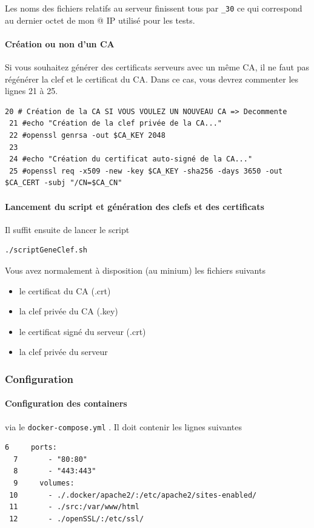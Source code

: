 \documentclass[french, 12pt]{article}%
\newcommand{\itemE}{\item[$\bullet$]}
\begin{document}
Les noms des fichiers relatifs au serveur finissent tous par \verb?_30? ce qui correspond au dernier octet de mon @ IP utilisé pour les tests.


\paragraph{Création ou non d'un CA}
Si vous souhaitez générer des certificats serveurs avec un même CA, il ne faut pas régénérer la clef et le certificat du CA. Dans ce cas, vous devrez commenter les lignes 21 à 25.

\begin{lstlisting}[style=commande]
 20 # Création de la CA SI VOUS VOULEZ UN NOUVEAU CA => Decommente
 21 #echo "Création de la clef privée de la CA..."
 22 #openssl genrsa -out $CA_KEY 2048
 23 
 24 #echo "Création du certificat auto-signé de la CA..."
 25 #openssl req -x509 -new -key $CA_KEY -sha256 -days 3650 -out $CA_CERT -subj "/CN=$CA_CN"

\end{lstlisting}


\paragraph{Lancement du script et génération des clefs et des certificats}
Il suffit ensuite de lancer le script

\begin{lstlisting}[style=commande]
./scriptGeneClef.sh 
\end{lstlisting}
Vous avez normalement à disposition (au minium) les fichiers suivants 
\begin{itemize}
\itemE le certificat du CA (.crt)
\itemE la clef privée du CA (.key)
\itemE le certificat signé du serveur (.crt)
\itemE la clef privée du serveur
\end{itemize}

\subsubsection{Configuration }


\paragraph{Configuration des containers} via le  \verb?docker-compose.yml? . Il doit contenir les lignes suivantes 

\begin{lstlisting}[style=commande]
  6     ports:
  7       - "80:80"
  8       - "443:443"
  9     volumes:
 10       - ./.docker/apache2/:/etc/apache2/sites-enabled/
 11       - ./src:/var/www/html
 12       - ./openSSL/:/etc/ssl/
\end{lstlisting}
\end{document}
